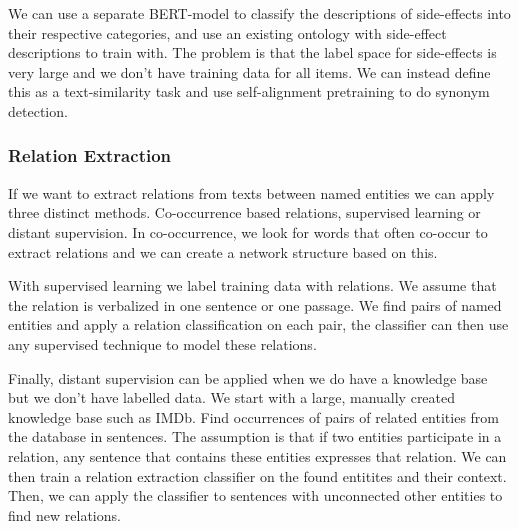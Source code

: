 We can use a separate BERT-model to classify the descriptions of side-effects
into their respective categories, and use an existing ontology with side-effect
descriptions to train with. The problem is that the label space for
side-effects is
very large and we don't have training data for all items. We can
instead define this
as a text-similarity task and use self-alignment pretraining to do
synonym detection.

\subsubsection{Relation Extraction}

If we want to extract relations from texts between named entities we
can apply three
distinct methods. Co-occurrence based relations, supervised learning
or distant supervision.
In co-occurrence, we look for words that often co-occur to extract
relations and we can create
a network structure based on this.

With supervised learning we label training data with relations. We
assume that the relation is verbalized in one sentence or one passage.
We find pairs of named entities and apply a relation classification
on each pair, the
classifier can then use any supervised technique to model these relations.

Finally, distant supervision can be applied when we do have a
knowledge base but we
don't have labelled data. We start with a large, manually created
knowledge base such
as IMDb. Find occurrences of pairs of related entities from the
database in sentences.
The assumption is that if two entities participate in a relation, any
sentence that contains
these entities expresses that relation. We can then train a relation
extraction classifier on
the found entitites and their context. Then, we can apply the
classifier to sentences with
unconnected other entities to find new relations.

